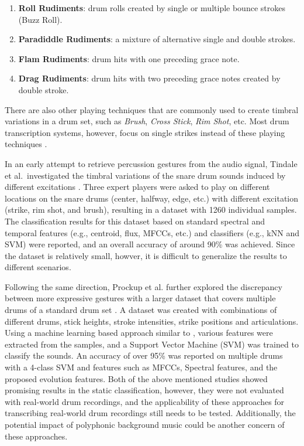 \documentclass{article}
\begin{document}
\begin{enumerate}
	\item \textbf{Roll Rudiments}: drum rolls created by single or multiple bounce strokes (Buzz Roll).
	\item \textbf{Paradiddle Rudiments}: a mixture of alternative single and double strokes. 
	\item \textbf{Flam Rudiments}: drum hits with one preceding grace note.
	\item \textbf{Drag Rudiments}: drum hits with two preceding grace notes created by double stroke.
\end{enumerate}

There are also other playing techniques that are commonly used to create timbral variations in a drum set, such as \textit{Brush}, \textit{Cross Stick}, \textit{Rim Shot}, etc. Most drum transcription systems, however, focus on single strikes instead of these playing techniques \cite{Benetos2014, Dittmar2014, Thompson2014, Roebel2015, Wu2015a}. 

In an early attempt to retrieve percussion gestures from the audio signal, Tindale et al.~investigated the timbral variations of the snare drum sounds induced by different excitations \cite{Tindale2004}. Three expert players were asked to play on different locations on the snare drums (center, halfway, edge, etc.) with different excitation (strike, rim shot, and brush), resulting in a dataset with 1260 individual samples. The classification results for this dataset based on standard spectral and temporal features (e.g., centroid, flux, MFCCs, etc.) and classifiers (e.g., kNN and SVM) were reported, and an overall accuracy of around 90\% was achieved. Since the dataset is relatively small, howver, it is difficult to generalize the results to different scenarios.  

Following the same direction, Prockup et al. further explored the discrepancy between more expressive gestures with a larger dataset that covers multiple drums of a standard drum set \cite{Prockup2013}. A dataset was created with combinations of different drums, stick heights, stroke intensities, strike positions and articulations. Using a machine learning based approach similar to \cite{Tindale2004}, various features were extracted from the samples, and a Support Vector Machine (SVM) was trained to classify the sounds. An accuracy of over 95\% was reported on multiple drums with a 4-class SVM and features such as MFCCs, Spectral features, and the proposed evolution features. Both of the above mentioned studies showed promising results in the static classification, however, they were not evaluated with real-world drum recordings, and the applicability of these approaches for transcribing real-world drum recordings still needs to be tested. Additionally, the potential impact of polyphonic background music could be another concern of these approaches. 
 
\end{document}
